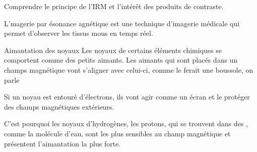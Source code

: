 \teteTermStssImag
\vspace*{-36pt}

\begin{objectifs}
  \item Comprendre le principe de l'IRM et l'intérêt des produits de contraste.
\end{objectifs}

\begin{contexte}
  L'magerie par ésonance agnétique est une technique d'imagerie médicale qui permet d'observer les tissus mous en temps réel.

\end{contexte}


\begin{doc}{Aimantation des noyaux}
  Les noyaux de certains éléments chimiques se comportent comme des petits aimants.
  Les aimants qui sont placés dans un champs magnétique vont s'aligner avec celui-ci, comme le ferait une boussole, on parle 
  
  Si un noyau est entouré d'électrons, ils vont agir comme un écran et le protéger des champs magnétiques extérieurs.

  C'est pourquoi les noyaux d'hydrogènes, les protons, qui se trouvent dans des , comme la molécule d'eau, sont les plus sensibles au champ magnétique et présentent l'aimantation la plus forte.
\end{doc}

